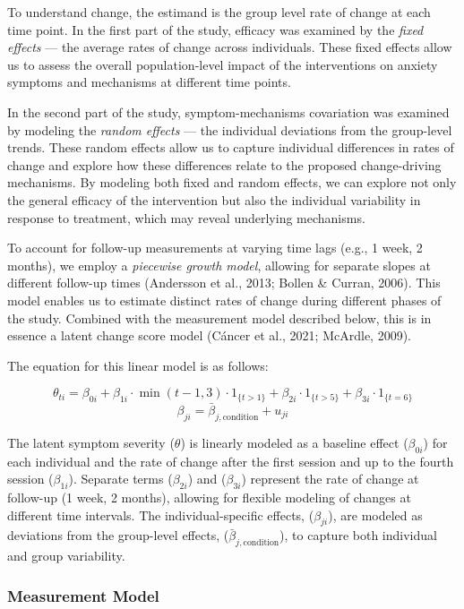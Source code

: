 \documentclass[
  man,floatsintext]{apa7}
\begin{document}
To understand change, the estimand is the group level rate of change at each time point.
In the first part of the study, efficacy was examined by the \emph{fixed effects} --- the average rates of change across individuals.
These fixed effects allow us to assess the overall population-level impact of the interventions on anxiety symptoms and mechanisms at different time points.

In the second part of the study, symptom-mechanisms covariation was examined by modeling the \emph{random effects} --- the individual deviations from the group-level trends.
These random effects allow us to capture individual differences in rates of change and explore how these differences relate to the proposed change-driving mechanisms.
By modeling both fixed and random effects, we can explore not only the general efficacy of the intervention but also the individual variability in response to treatment, which may reveal underlying mechanisms.

To account for follow-up measurements at varying time lags (e.g., 1 week, 2 months), we employ a \emph{piecewise growth model}, allowing for separate slopes at different follow-up times (Andersson et al., 2013; Bollen \& Curran, 2006).
This model enables us to estimate distinct rates of change during different phases of the study.
Combined with the measurement model described below, this is in essence a latent change score model (Cáncer et al., 2021; McArdle, 2009).

The equation for this linear model is as follows:

\[\theta_{ti} = \beta_{0i} + \beta_{1i} \cdot \min(t-1, 3) \cdot 1_{\{t > 1\}} + \beta_{2i} \cdot 1_{\{t > 5\}} + \beta_{3i} \cdot 1_{\{t=6\}}\]
\[\beta_{ji} = \bar{\beta}_{j,\text{condition}} + u_{ji}\]

The latent symptom severity (\(\theta\)) is linearly modeled as a baseline effect (\(\beta_{0i}\)) for each individual and the rate of change after the first session and up to the fourth session (\(\beta_{1i}\)).
Separate terms (\(\beta_{2i}\)) and (\(\beta_{3i}\)) represent the rate of change at follow-up (1 week, 2 months), allowing for flexible modeling of changes at different time intervals.
The individual-specific effects, (\(\beta_{ji}\)), are modeled as deviations from the group-level effects, (\(\bar{\beta}_{j,\text{condition}}\)), to capture both individual and group variability.

\subsubsection{Measurement Model}\label{measurement-model}
\end{document}

